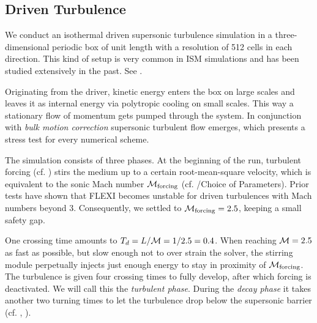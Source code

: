 \subsection{Driven Turbulence}
\label{sec:stirturb}

We conduct an isothermal driven supersonic turbulence simulation in a
three-dimensional periodic box of unit length with a resolution of 512 cells in
each direction. This kind of setup is very common in ISM simulations and has
been studied extensively in the past. See
\cite{schmidt2009numerical,kitsionas2009algorithmic,0004-637X-665-1-416,mac1998kinetic}.

Originating from the driver, kinetic energy enters the box on large scales
and leaves it as internal energy via polytropic cooling on small scales. This way a
stationary flow of momentum gets pumped through the system.  In conjunction
with \emph{bulk motion correction} supersonic turbulent flow emerges, which
presents a stress test for every numerical scheme.

The simulation consists of three phases. At the beginning of the run, turbulent
forcing (cf. ) stirs the medium up to a certain
root-mean-square velocity, which is equivalent to the sonic Mach number
$\mathcal{M}_{\text{forcing}}$ (cf. /Choice of Parameters).
Prior tests have shown that FLEXI becomes unstable for driven turbulences with
Mach numbers beyond 3.  Consequently, we settled to $\mathcal{M}_{\text{forcing}} =
2.5$, keeping a small safety gap.

One crossing time amounts to $T_d = L/\mathcal{M} = 1/2.5 = 0.4$. When reaching
$\mathcal{M} = 2.5$ as fast as possible, but slow enough not to over strain the solver, the
stirring module perpetually injects just enough energy to stay in proximity of
$\mathcal{M}_{\text{forcing}}$. The turbulence is given four crossing times to fully
develop, after which forcing is deactivated.  We will call this the
\emph{turbulent phase}. During the \emph{decay phase} it takes another two
turning times to let the turbulence drop below the supersonic barrier
(cf. \cite{stone1998dissipation}, \cite{mac1998kinetic}).

